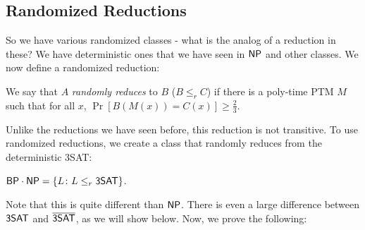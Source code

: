 \subsection{Randomized Reductions}
So we have various randomized classes - what is the analog of a reduction in these? We have deterministic ones that we have seen in ${\mathsf{NP}}$ and other classes. We now define a randomized reduction:
\begin{definition}
We say that $A$ \emph{randomly reduces} to $B$ ($B \le_r C$) if there is a poly-time PTM $M$ such that for all $x$, $\Pr[B(M(x)) = C(x)] \ge \frac{2}{3}$. 
\end{definition}
Unlike the reductions we have seen before, this reduction is not transitive. To use randomized reductions, we create a class that randomly reduces from the deterministic 3SAT:
\begin{definition}
${\mathsf{BP}}\cdot {\ensuremath{\mathsf{NP}}} = \{L \colon L \le_r {\mathsf{3SAT}}\}$. 
\end{definition}
Note that this is quite different than ${\mathsf{NP}}$. There is even a large difference between ${\mathsf{3SAT}}$ and $\overline{{\mathsf{3SAT}}}$, as we will show below. Now, we prove the following:

